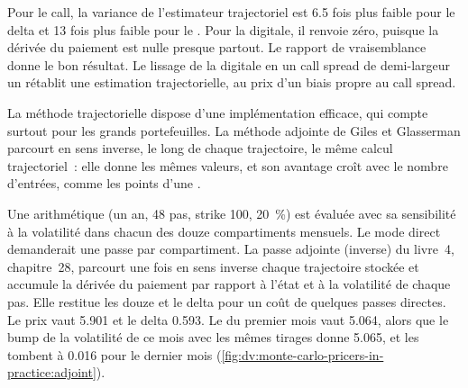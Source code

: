 Pour le call, la variance de l'estimateur trajectoriel est 6.5 fois plus faible pour le delta et 13 fois plus faible pour le . Pour la digitale, il renvoie zéro, puisque la
dérivée du paiement est nulle presque partout. Le rapport de vraisemblance donne le bon résultat. Le lissage de la digitale en un call spread de demi-largeur un rétablit
une estimation trajectorielle, au prix d'un biais propre au call spread.

La méthode trajectorielle dispose d'une implémentation efficace, qui compte surtout pour les grands portefeuilles. La méthode adjointe de Giles et Glasserman
parcourt en sens inverse, le long de chaque trajectoire, le même calcul trajectoriel~: elle donne les mêmes valeurs, et son avantage croît avec le nombre
d'entrées, comme les points d'une .

\begin{example}\label{ex:dv:monte-carlo-pricers-in-practice:adjoint}
Une  arithmétique (un an, 48 pas, strike 100, 20~\%) est évaluée avec sa sensibilité à la volatilité dans chacun des douze compartiments mensuels.
Le mode direct demanderait une passe par compartiment. La passe adjointe (inverse) du livre~4, chapitre~28, parcourt une fois en sens inverse chaque trajectoire stockée
et accumule la dérivée du paiement par rapport à l'état et à la volatilité de chaque pas. Elle restitue les douze  et le delta pour un coût de
quelques passes directes. Le prix vaut 5.901 et le delta 0.593. Le  du premier mois vaut 5.064, alors que le bump de la volatilité de ce mois avec
les mêmes tirages donne 5.065, et les  tombent à 0.016 pour le dernier mois (\cref{fig:dv:monte-carlo-pricers-in-practice:adjoint}).
\end{example}

